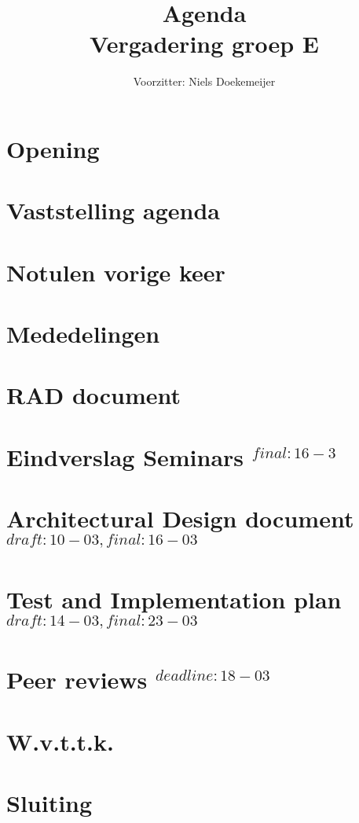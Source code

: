 \documentclass[a4paper]{article}
\title{Agenda \\ Vergadering groep E}
\author{Voorzitter: Niels Doekemeijer}
\begin{document}
\maketitle
\section{Opening}
\section{Vaststelling agenda}
\section{Notulen vorige keer}
\section{Mededelingen}
\section{RAD document}
\section{Eindverslag Seminars $^{final: 16-3}$}
\section{Architectural Design document $^{draft: 10-03, final: 16-03}$}
\section{Test and Implementation plan $^{draft: 14-03, final: 23-03}$}
\section{Peer reviews $^{deadline: 18-03}$}
\section{W.v.t.t.k.}
\section{Sluiting}
\end{document}
